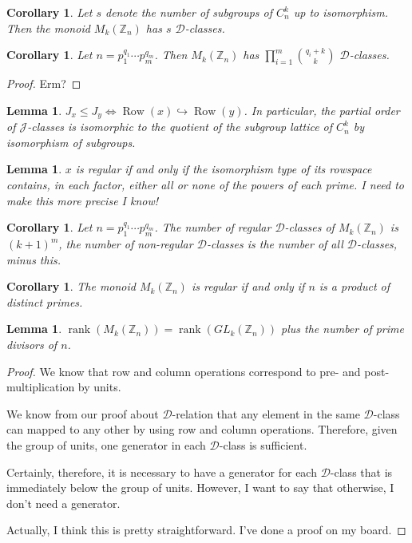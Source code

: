 \documentclass{article}
\newcommand{\rank}{\operatorname{rank}}
\newcommand{\D}{\mathscr{D}}
\newcommand{\J}{\mathscr{J}}
\newcommand{\rowsp}{\operatorname{Row}}
\newtheorem{lem}[thm]{Lemma}
\newtheorem{cor}[thm]{Corollary}
\theoremstyle{definition}
\begin{document}
\begin{cor}
  Let $s$ denote the number of subgroups of $C_{n}^{k}$ up to
  isomorphism. Then the monoid $M_{k}(\mathbb{Z}_{n})$ has $s$ $\D$-classes.
\end{cor}

\begin{cor}
  Let $n = p_{1}^{q_{1}} \cdots p_{m}^{q_{m}}$.
  Then $M_{k}(\mathbb{Z}_{n})$ has $\displaystyle\prod_{i = 1}^{m} {{q_{i} + k}
  \choose k}$ $\D$-classes.
\end{cor}

\begin{proof}
  Erm?
\end{proof}

\begin{lem}\label{lem-J-order}
  $J_{x} \leq J_{y} \Leftrightarrow \rowsp(x) \hookrightarrow \rowsp(y)$.
  In particular, the partial order of $\J$-classes is isomorphic to the quotient
  of the subgroup lattice of $C_{n}^{k}$ by isomorphism of subgroups.
\end{lem}

\begin{lem}
  $x$ is regular if and only if the isomorphism type of its rowspace contains,
  in each factor, either all or none of the powers of each prime. I need to make
  this more precise I know!
\end{lem}

\begin{cor}
  Let $n = p_{1}^{q_{1}} \cdots p_{m}^{q_{m}}$.  The number of regular
  $\D$-classes of $M_{k}(\mathbb{Z}_{n})$ is ${(k + 1)} ^ {m}$, the number of
  non-regular $\D$-classes is the number of all $\D$-classes, minus this.
\end{cor}

\begin{cor}
  The monoid $M_{k}(\mathbb{Z}_{n})$ is regular if and only if $n$ is a product
  of distinct primes.
\end{cor}

\begin{lem}
  $\rank(M_{k}(\mathbb{Z}_{n})) = \rank(GL_{k}(\mathbb{Z}_{n}))$ plus the number
  of prime divisors of $n$.
\end{lem}

\begin{proof}
We know that row and column operations correspond to pre- and
post-multiplication by units.

We know from our proof about $\D$-relation that any element in the same
$\D$-class can mapped to any other by using row and column operations.
Therefore, given the group of units, one generator in each $\D$-class is
sufficient.

Certainly, therefore, it is necessary to have a generator for each $\D$-class
that is immediately below the group of units. However, I want to say that
otherwise, I don't need a generator.

Actually, I think this is pretty straightforward. I've done a proof on my board.
\end{proof}
\end{document}

